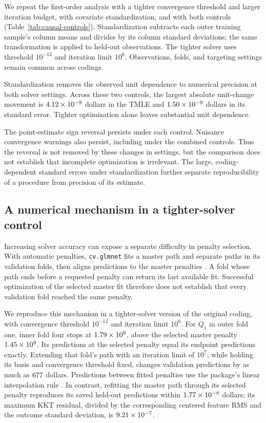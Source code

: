 \documentclass[11pt]{article}
\theoremstyle{definition}
\theoremstyle{remark}
\begin{document}
We repeat the first-order analysis with a tighter convergence threshold
and larger iteration budget, with covariate standardization, and with both
controls (Table~\ref{tab:causal-controls}). Standardization subtracts each
outer training sample's column means and divides by its column standard
deviations; the same transformation is applied to held-out observations.
The tighter solver uses threshold $10^{-12}$ and iteration limit $10^6$.
Observations, folds, and targeting settings remain common across codings.

Standardization removes the observed unit dependence to numerical precision
at both solver settings. Across these two controls, the largest absolute
unit-change movement is $4.12\times10^{-9}$ dollars in the
TMLE and $1.50\times10^{-9}$ dollars in its standard error.
Tighter optimization alone leaves substantial unit dependence.

The point-estimate sign reversal persists under each control. Nuisance
convergence warnings also persist, including under the combined controls.
Thus the reversal is not removed by these changes in settings, but the
comparison does not establish that incomplete optimization is irrelevant.
The large, coding-dependent standard errors under standardization further
separate reproducibility of a procedure from precision of its estimate.



\subsection{A numerical mechanism in a tighter-solver control}

Increasing solver accuracy can expose a separate difficulty in penalty
selection. With automatic penalties, \texttt{cv.glmnet} fits a master path
and separate paths in its validation folds, then aligns predictions to the
master penalties \citep{glmnetcv}. A fold whose path ends before a requested
penalty can return its last available fit. Successful optimization of the
selected master fit therefore does not establish that every validation
fold reached the same penalty.

We reproduce this mechanism in a tighter-solver version of the original
coding, with convergence threshold $10^{-12}$ and iteration limit $10^6$.
For $Q_1$ in outer fold one, inner fold four stops at
$1.79\times10^{9}$, above the selected master penalty
$1.45\times10^{9}$. Its predictions at the selected penalty equal its
endpoint predictions exactly. Extending that fold's path with an iteration
limit of $10^7$, while holding its basis and convergence threshold fixed,
changes validation predictions by as much as $677$
dollars. Predictions between fitted penalties use the package's linear
interpolation rule \citep{glmnetpredict}. In contrast, refitting the master
path through its selected penalty reproduces its saved held-out predictions
within $1.77\times10^{-8}$ dollars; its maximum KKT residual, divided by
the corresponding centered feature RMS and the outcome standard deviation,
is $9.21\times10^{-7}$.
\end{document}
